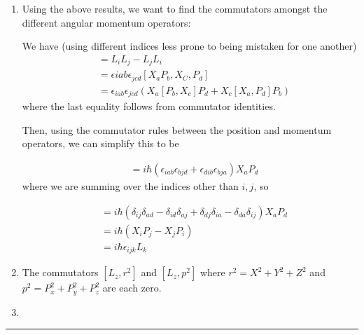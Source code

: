 \documentclass[twoside]{article}
\begin{document}
\begin{enumerate}
   \item Using the above results, we want to find the commutators amongst the different angular momentum operators:
   
   We have (using different indices less prone to being mistaken for one another)
   \begin{align*}
      [L_i, L_j] &= L_i L_j - L_j L_i \\
      &= \epsilon{iab} \epsilon_{jcd} [X_a P_b, X_C, P_d] \\
      &= \epsilon_{iab}\epsilon_{jcd} \left( X_a [P_b, X_c]P_d + X_c[X_a, P_d]P_b\right)
   \end{align*}
   where the last equality follows from commutator identities.

   Then, using the commutator rules between the position and momentum operators, we can simplify this to be

   \begin{align*}
      [L_i, L_j] &= i\hbar \left( \epsilon_{iab} \epsilon_{bjd} + \epsilon_{dib} \epsilon_{bja}\right) X_a P_d 
   \end{align*}
   where we are summing over the indices other than $i, j$, so
   
   \begin{align*}
      [L_i, L_j] &= i\hbar \left( \delta_{ij}\delta_{ad} - \delta_{id}\delta_{aj} + \delta_{dj}\delta_{ia} - \delta_{da}\delta_{ij} \right) X_a P_d \\
      &= i\hbar (X_i P_j - X_j P_i) \\
      &= i\hbar \epsilon_{ijk} L_k
   \end{align*}
   \vskip 1cm

   \item The commutators $[L_z, r^2]$ and $[L_z, p^2]$ where $r^2 = X^2 + Y^2 + Z^2$ and $p^2 = P_x^2 + P_y^2 + P_z^2$ are each zero.
   \vskip 1cm

   \item 

\end{enumerate}

\vskip 0.5cm
\hrule
\vskip 0.5cm
\end{document}
